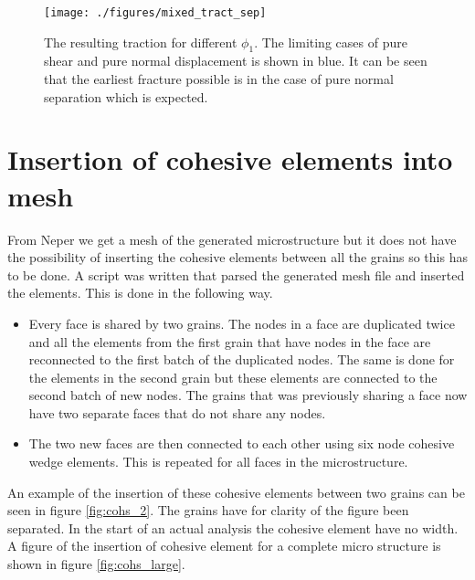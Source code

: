 \documentclass[generate_interface_elements.tex]{subfiles}
\begin{document}
\begin{figure}[h]
\centering
  \texttt{[image: ./figures/mixed\_tract\_sep]}
\caption{The resulting traction for different $\phi_1$. The limiting cases of pure shear and pure normal displacement is shown in blue. It can be seen that the earliest fracture possible is in the case of pure normal separation which is expected. }
\label{fig:mixed_tract_sep}
\end{figure}



\section{Insertion of cohesive elements into mesh}

From Neper we get a mesh of the generated microstructure but it does not have the possibility of inserting the cohesive elements between all the grains so this has to be done. A script was written that parsed the generated mesh file and inserted the elements. This is done in the following way. 
%
\begin{itemize}
\item Every face is shared by two grains. The nodes in a face are duplicated twice and all the elements from the first grain that have nodes in the face are reconnected to the first batch of the duplicated nodes.  The same is done for the elements in the second grain but these elements are connected to the second batch of new nodes. The grains that was previously sharing a face now have two separate faces that do not share any nodes.
\item The two new faces are then connected to each other using six node cohesive wedge elements. This is repeated for all faces in the microstructure. 
\end{itemize}
%
An example of the insertion of these cohesive elements between two grains can be seen in figure \ref{fig:cohs_2}. The grains have for clarity of the figure been separated. In the start of an actual analysis the cohesive element have no width. A figure of the insertion of cohesive element for a complete micro structure is shown in figure \ref{fig:cohs_large}.
\end{document}
